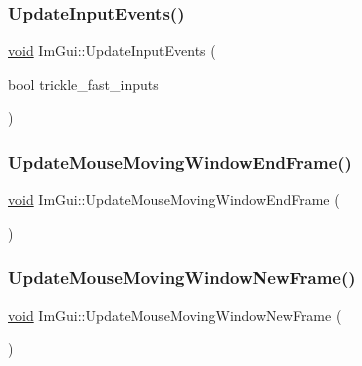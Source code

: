 \mbox{\label{namespaceImGui_aafed9b47752723162308368c01eeffad}} 
\subsubsection{\texorpdfstring{Update\+Input\+Events()}{UpdateInputEvents()}}
{\footnotesize\ttfamily \hyperlink{imgui__impl__opengl3__loader_8h_ac668e7cffd9e2e9cfee428b9b2f34fa7}{void} Im\+Gui\+::\+Update\+Input\+Events (\begin{DoxyParamCaption}\item[{bool}]{trickle\+\_\+fast\+\_\+inputs }\end{DoxyParamCaption})}

\mbox{\label{namespaceImGui_a6f56217f28aff3a7cea846e6f44eebff}} 
\subsubsection{\texorpdfstring{Update\+Mouse\+Moving\+Window\+End\+Frame()}{UpdateMouseMovingWindowEndFrame()}}
{\footnotesize\ttfamily \hyperlink{imgui__impl__opengl3__loader_8h_ac668e7cffd9e2e9cfee428b9b2f34fa7}{void} Im\+Gui\+::\+Update\+Mouse\+Moving\+Window\+End\+Frame (\begin{DoxyParamCaption}{ }\end{DoxyParamCaption})}

\mbox{\label{namespaceImGui_a3c60e468d73a0ccd52628f0c82b42fe8}} 
\subsubsection{\texorpdfstring{Update\+Mouse\+Moving\+Window\+New\+Frame()}{UpdateMouseMovingWindowNewFrame()}}
{\footnotesize\ttfamily \hyperlink{imgui__impl__opengl3__loader_8h_ac668e7cffd9e2e9cfee428b9b2f34fa7}{void} Im\+Gui\+::\+Update\+Mouse\+Moving\+Window\+New\+Frame (\begin{DoxyParamCaption}{ }\end{DoxyParamCaption})}

